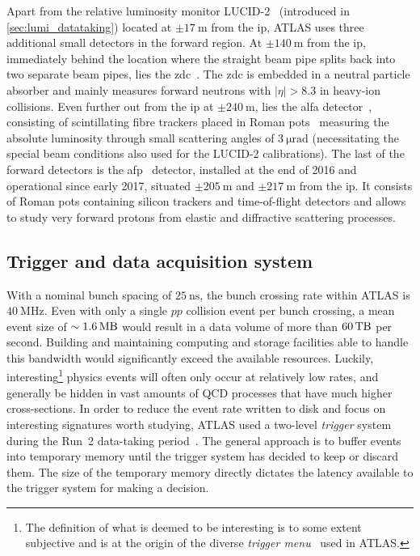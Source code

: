 Apart from the relative luminosity monitor LUCID-2~\cite{Avoni_2018} (introduced in \cref{sec:lumi_datataking}) located at $\pm \SI{17}{\meter}$ from the \gls{ip}, ATLAS uses three additional small detectors in the forward region. At $\pm \SI{140}{\meter}$ from the \gls{ip}, immediately behind the location where the straight beam pipe splits back into two separate beam pipes, lies the \gls{zdc}~\cite{Leite:1628749}. The \gls{zdc} is embedded in a neutral particle absorber and mainly measures forward neutrons with $\vert\eta\vert > 8.3$ in heavy-ion collisions. Even further out from the \gls{ip} at $\pm \SI{240}{\meter}$, lies the \gls{alfa} detector~\cite{AbdelKhalek:2016tiv}, consisting of scintillating fibre trackers placed in Roman pots~\cite{AMALDI1977390} measuring the absolute luminosity through small scattering angles of $\SI{3}{\micro\radian}$ (necessitating the special beam conditions also used for the LUCID-2 calibrations). The last of the forward detectors is the \gls{afp}~\cite{Adamczyk:2017378} detector, installed at the end of 2016 and operational since early 2017, situated $\pm\SI{205}{\meter}$ and $\pm\SI{217}{\meter}$ from the \gls{ip}. It consists of Roman pots containing silicon trackers and time-of-flight detectors and allows to study very forward protons from elastic and diffractive scattering processes.

\subsection{Trigger and data acquisition system}\label{sec:trigger}

With a nominal bunch spacing of $\SI{25}{\nano\second}$, the bunch crossing rate within ATLAS is $\SI{40}{\MHz}$. Even with only a single $pp$ collision event per bunch crossing, a mean event size of $\sim \SI{1.6}{\mega\byte}$ would result in a data volume of more than $\SI{60}{\tera\byte}$ per second. Building and maintaining computing and storage facilities able to handle this bandwidth would significantly exceed the available resources. Luckily, interesting\footnote{The definition of what is deemed to be interesting is to some extent subjective and is at the origin of the diverse \textit{trigger menu}~\cite{Martinez:2016udm} used in ATLAS.} physics events will often only occur at relatively low rates, and generally be hidden in vast amounts of QCD processes that have much higher cross-sections. In order to reduce the event rate written to disk and focus on interesting signatures worth studying, ATLAS used a two-level \textit{trigger} system during the Run~2 data-taking period~\cite{Martinez:2016udm}. The general approach is to buffer events into temporary memory until the trigger system has decided to keep or discard them. The size of the temporary memory directly dictates the latency available to the trigger system for making a decision.

